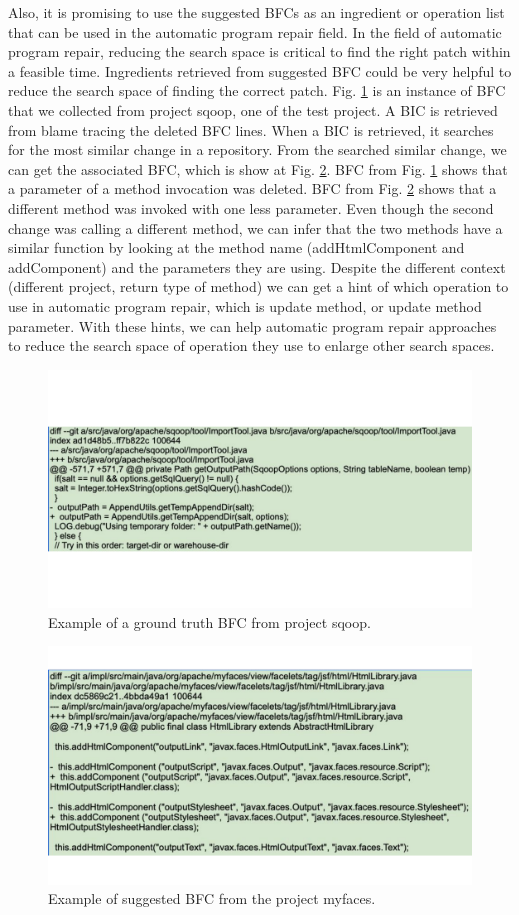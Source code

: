 Also, it is promising to use the suggested BFCs as an ingredient or operation list that can be used in the automatic program repair field.
In the field of automatic program repair, reducing the search space is critical to find the right patch within a feasible time.
Ingredients retrieved from suggested BFC could be very helpful to reduce the search space of finding the correct patch.
Fig. \ref{fig:ex_1} is an instance of BFC that we collected from project sqoop, one of the test project. 
A BIC is retrieved from blame tracing the deleted BFC lines.
When a BIC is retrieved, it searches for the most similar change in a repository.
From the searched similar change, we can get the associated BFC, which is show at Fig. \ref{fig:ex_2}.
BFC from Fig. \ref{fig:ex_1} shows that a parameter of a method invocation was deleted.
BFC from Fig. \ref{fig:ex_2} shows that a different method was invoked with one less parameter.
Even though the second change was calling a different method, we can infer that the two methods have a similar function by looking at the method name (addHtmlComponent and addComponent) and the parameters they are using.
Despite the different context (different project, return type of method) we can get a hint of which operation to use in automatic program repair, which is update method, or update method parameter.
With these hints, we can help automatic program repair approaches to reduce the search space of operation they use to enlarge other search spaces.


\begin{figure}[!tbp]
\renewcommand{\arraystretch}{1}
    \centering
    \includegraphics[width=\linewidth]{figures/patchsuggstion_ex1.pdf}\hfill
    \caption{Example of a ground truth BFC from project sqoop.}
    \label{fig:ex_1}
\end{figure}

\begin{figure}[!tbp]
\renewcommand{\arraystretch}{1}
    \centering
    \includegraphics[width=\linewidth]{figures/patchsuggstion_ex2.pdf}\hfill
    \caption{Example of suggested BFC from the project myfaces.}
    \label{fig:ex_2}
\end{figure}
